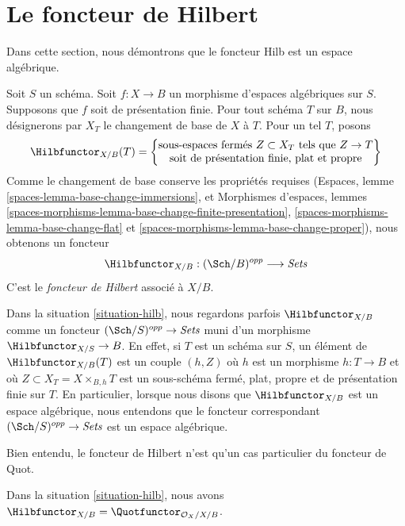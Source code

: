 \section{Le foncteur de Hilbert}
\label{section-hilb}

\noindent
Dans cette section, nous démontrons que le foncteur Hilb est un espace
algébrique.

\begin{situation}
\label{situation-hilb}
Soit $S$ un schéma. Soit $f : X \to B$ un morphisme d'espaces algébriques sur
$S$. Supposons que $f$ soit de présentation finie. Pour tout schéma $T$ sur
$B$, nous désignerons par $X_T$ le changement de base de $X$ à $T$. Pour un
tel $T$, posons
$$
\Hilbfunctor_{X/B}(T) =
\left\{
\begin{matrix}
\text{sous-espaces fermés }Z \subset X_T\text{ tels que }Z \to T\\
\text{soit de présentation finie, plat et propre}
\end{matrix}
\right\}
$$
Comme le changement de base conserve les propriétés requises (Espaces, lemme
\ref{spaces-lemma-base-change-immersions}, et Morphismes d'espaces, lemmes
\ref{spaces-morphisms-lemma-base-change-finite-presentation},
\ref{spaces-morphisms-lemma-base-change-flat} et
\ref{spaces-morphisms-lemma-base-change-proper}), nous obtenons un foncteur
\begin{equation}
\label{equation-hilb}
\Hilbfunctor_{X/B} : (\Sch/B)^{opp} \longrightarrow \textit{Sets}
\end{equation}
C'est le {\it foncteur de Hilbert} associé à $X/B$.
\end{situation}

\noindent
Dans la situation \ref{situation-hilb}, nous regardons parfois
$\Hilbfunctor_{X/B}$ comme un foncteur
$(\Sch/S)^{opp} \to \textit{Sets}$ muni d'un morphisme
$\Hilbfunctor_{X/S} \to B$. En effet, si $T$ est un schéma sur $S$, un
élément de $\Hilbfunctor_{X/B}(T)$ est un couple $(h, Z)$ où $h$ est un
morphisme $h : T \to B$ et où $Z \subset X_T = X \times_{B, h} T$ est un
sous-schéma fermé, plat, propre et de présentation finie sur $T$. En
particulier, lorsque nous disons que $\Hilbfunctor_{X/B}$ est un espace
algébrique, nous entendons que le foncteur correspondant
$(\Sch/S)^{opp} \to \textit{Sets}$ est un espace algébrique.

\medskip\noindent
Bien entendu, le foncteur de Hilbert n'est qu'un cas particulier du foncteur
de Quot.

\begin{lemma}
\label{lemma-hilb-is-quot}
Dans la situation \ref{situation-hilb}, nous avons
$\Hilbfunctor_{X/B} = \Quotfunctor_{\mathcal{O}_X/X/B}$.
\end{lemma}


